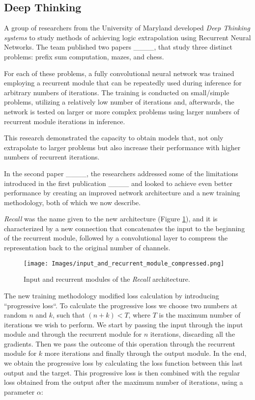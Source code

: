 \subsection{Deep Thinking}

A group of researchers from the University of Maryland developed \textit{Deep Thinking systems} to study methods of achieving logic extrapolation using Recurrent Neural Networks. The team published two papers ____, that study three distinct problems: prefix sum computation, mazes, and chess.

For each of these problems, a fully convolutional neural network was trained employing a recurrent module that can be repeatedly used during inference for arbitrary numbers of iterations. The training is conducted on small/simple problems, utilizing a relatively low number of iterations and, afterwards, the network is tested on larger or more complex problems using larger numbers of recurrent module iterations in inference.

This research demonstrated the capacity to obtain models that, not only extrapolate to larger problems but also increase their performance with higher numbers of recurrent iterations.

In the second paper ____, the researchers addressed some of the limitations introduced in the first publication ____ and looked to achieve even better performance by creating an improved network architecture and a new training methodology, both of which we now describe.

\textit{Recall} was the name given to the new architecture (Figure \ref{input_and_recurrent_modules}), and it is characterized by a new connection that concatenates the input to the beginning of the recurrent module, followed by a convolutional layer to compress the representation back to the original number of channels.


\begin{figure}[h]
\begin{center}
\texttt{[image: Images/input\_and\_recurrent\_module\_compressed.png]}
\caption{Input and recurrent modules of the \textit{Recall} architecture.}\label{input_and_recurrent_modules}
\end{center}
\end{figure}

The new training methodology modified loss calculation by introducing ``progressive loss``. To calculate the progressive loss we choose two numbers at random $n$ and $k$, such that $ (n + k) < T$, where $T$ is the maximum number of iterations we wish to perform. We start by passing the input through the input module and through the recurrent module for $n$ iterations, discarding all the gradients. Then we pass the outcome of this operation through the recurrent module for $k$ more iterations and finally through the output module. In the end, we obtain the progressive loss by calculating the loss function between this last output and the target. This progressive loss is then combined with the regular loss obtained from the output after the maximum number of iterations, using a parameter $\alpha$:

